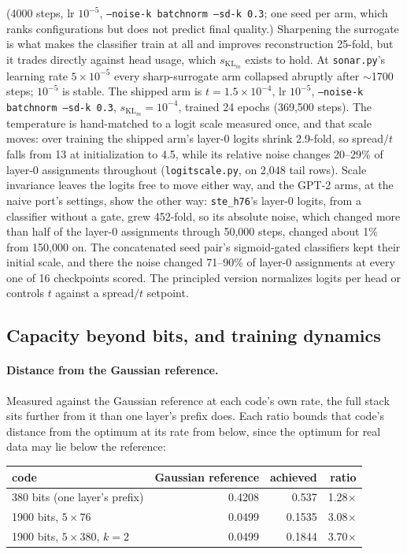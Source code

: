 (4000 steps, lr $10^{-5}$, \texttt{--noise-k batchnorm --sd-k 0.3}; one
seed per arm, which ranks configurations but does not predict final
quality.) Sharpening the surrogate is what makes the classifier train at
all and improves reconstruction 25-fold, but it trades directly against
head usage, which $s_{\mathrm{KL}_m}$ exists to hold. At \texttt{sonar.py}'s
learning rate $5\times10^{-5}$ every sharp-surrogate arm collapsed
abruptly after $\sim$1700 steps; $10^{-5}$ is stable. The shipped arm is
$t{=}1.5\times10^{-4}$, lr $10^{-5}$, \texttt{--noise-k batchnorm
--sd-k 0.3}, $s_{\mathrm{KL}_m}{=}10^{-4}$, trained 24 epochs
(369{,}500 steps). The temperature is hand-matched to a logit scale
measured once, and that scale moves: over training the shipped arm's
layer-0 logits shrink 2.9-fold, so spread$/t$ falls from 13 at
initialization to 4.5, while its relative noise changes 20--29\% of
layer-0 assignments throughout (\texttt{logitscale.py}, on 2{,}048 tail
rows). Scale invariance leaves the logits free to move either way, and
the GPT-2 arms, at the naive port's settings, show the other way:
\texttt{ste\_h76}'s layer-0 logits, from a classifier without a gate,
grew 452-fold, so its absolute noise, which changed more than half of the
layer-0 assignments through 50{,}000 steps, changed about 1\% from
150{,}000 on. The concatenated seed pair's sigmoid-gated classifiers kept
their initial scale, and there the noise changed 71--90\% of layer-0
assignments at every one of 16 checkpoints scored. The principled
version normalizes logits per head or controls $t$ against a spread$/t$
setpoint.

\subsection{Capacity beyond bits, and training dynamics}
\label{sec:capacity}

\paragraph{Distance from the Gaussian reference.} Measured against the
Gaussian reference at each code's own rate, the full stack sits further
from it than one layer's prefix does. Each ratio bounds that code's
distance from the optimum at its rate from below, since the optimum for
real data may lie below the reference:

\begin{center}\small
\begin{tabular}{@{}lrrr@{}}
\toprule
code & Gaussian reference & achieved & ratio \\
\midrule
380 bits (one layer's prefix) & 0.4208 & 0.537 & 1.28$\times$ \\
1900 bits, $5\times76$ & 0.0499 & 0.1535 & 3.08$\times$ \\
1900 bits, $5\times380$, $k{=}2$ & 0.0499 & 0.1844 & 3.70$\times$ \\
\bottomrule
\end{tabular}
\end{center}

